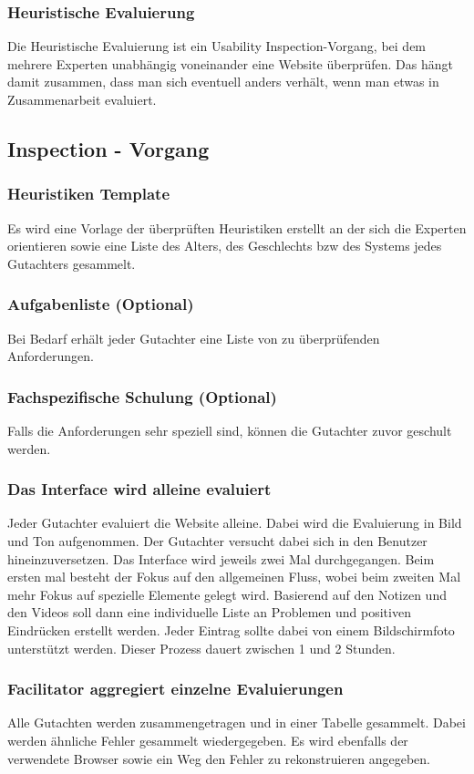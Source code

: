 \documentclass{article}
\begin{document}
	\subsubsection{Heuristische Evaluierung}
	Die Heuristische Evaluierung ist ein Usability Inspection-Vorgang, bei dem mehrere Experten unabhängig voneinander eine Website überprüfen. Das hängt damit zusammen, dass man sich eventuell anders verhält, wenn man etwas in Zusammenarbeit evaluiert.

	\subsection{Inspection - Vorgang}
	\subsubsection{Heuristiken Template}
	Es wird eine Vorlage der überprüften Heuristiken erstellt an der sich die Experten orientieren sowie eine Liste des Alters, des Geschlechts bzw des Systems jedes Gutachters gesammelt.
	\subsubsection{Aufgabenliste (Optional)}
	Bei Bedarf erhält jeder Gutachter eine Liste von zu überprüfenden Anforderungen.
	\subsubsection{Fachspezifische Schulung (Optional)}
	Falls die Anforderungen sehr speziell sind, können die Gutachter zuvor geschult werden.
	\subsubsection{Das Interface wird alleine evaluiert}
	Jeder Gutachter evaluiert die Website alleine. Dabei wird die Evaluierung in Bild und Ton aufgenommen. Der Gutachter versucht dabei sich in den Benutzer hineinzuversetzen. Das Interface wird jeweils zwei Mal durchgegangen. Beim ersten mal besteht der Fokus auf den allgemeinen Fluss, wobei beim zweiten Mal mehr Fokus auf spezielle Elemente gelegt wird. Basierend auf den Notizen und den Videos soll dann eine individuelle Liste an Problemen und positiven Eindrücken erstellt werden. Jeder Eintrag sollte dabei von einem Bildschirmfoto unterstützt werden. Dieser Prozess dauert zwischen 1 und 2 Stunden.
	\subsubsection{Facilitator aggregiert einzelne Evaluierungen}
	Alle Gutachten werden zusammengetragen und in einer Tabelle gesammelt. Dabei werden ähnliche Fehler gesammelt wiedergegeben. Es wird ebenfalls der verwendete Browser sowie ein Weg den Fehler zu rekonstruieren angegeben.
\end{document}
